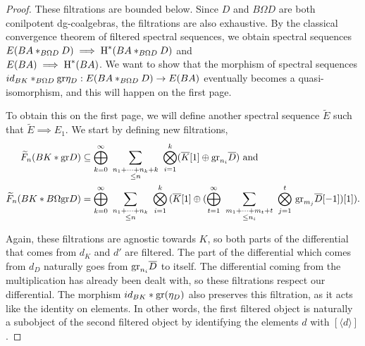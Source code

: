 \documentclass[../thesis.tex]{subfiles}
\begin{document}
\begin{proof}
                These filtrations are bounded below. Since $D$ and $B\Omega D$ are both conilpotent dg-coalgebras, the filtrations are also exhaustive. By the classical convergence theorem of filtered spectral sequences, we obtain spectral sequences $E(BA\ast_{B\Omega D}D) \implies \tt{H}^*(BA\ast_{B\Omega D}D)$ and \\ $E(BA) \implies \tt{H}^*(BA)$. We want to show that the morphism of spectral sequences $id_{BK}\ast_{B\Omega D}\tt{gr}\eta_D: E(BA\ast_{B\Omega D}D) \rightarrow E(BA)$ eventually becomes a quasi-isomorphism, and this will happen on the first page.

                To obtain this on the first page, we will define another spectral sequence $\widetilde{E}$ such that $\widetilde{E} \implies E_1$. We start by defining new filtrations,
                \begin{align*}
                    \widetilde{F}_n(BK\ast\tt{gr}D) & \subseteq \bigoplus_{k=0}^\infty\,\,\sum_{\substack{n_1+\cdots +n_k + k \\ \leq n}}\,\,\bigotimes_{i=1}^k(\overline{K}[1]\oplus \tt{gr}_{n_i}\overline{D})\tt{ and} \\
                    \widetilde{F}_n(BK\ast B\Omega\tt{gr}D) & = \bigoplus_{k=0}^\infty\,\,\sum_{\substack{n_1+\cdots +n_k \\ \leq n}}\,\,\bigotimes_{i=1}^k\,(\overline{K}[1]\oplus(\bigoplus_{t=1}^\infty\,\,\sum_{\substack{m_1+\cdots +m_t + t \\ \leq n_i}}\,\,\bigotimes_{j=1}^t\,\tt{gr}_{m_j}\overline{D}[-1])[1])\tt{.}
                \end{align*}

                Again, these filtrations are agnostic towards $K$, so both parts of the differential that comes from $d_K$ and $d'$ are filtered. The part of the differential which comes from $d_D$ naturally goes from $\tt{gr}_{n_i}\overline{D}$ to itself. The differential coming from the multiplication has already been dealt with, so these filtrations respect our differential. The morphism $id_{BK}\ast\tt{gr}(\eta_D)$ also preserves this filtration, as it acts like the identity on elements. In other words, the first filtered object is naturally a subobject of the second filtered object by identifying the elements $d$ with $[\langle d \rangle ]$.


\end{proof}
\end{document}
